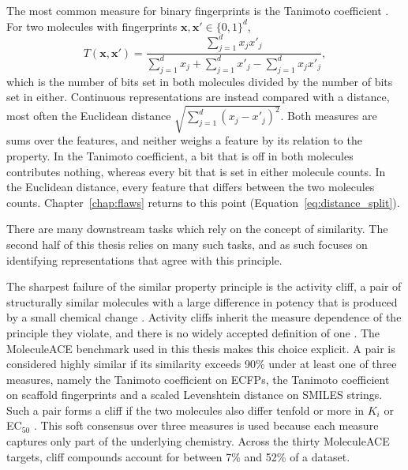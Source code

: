 The most common measure for binary fingerprints is the Tanimoto coefficient \citep{Bajusz2015}. For two molecules with fingerprints $\mathbf{x}, \mathbf{x}' \in \{0,1\}^d$,
\begin{equation}
T(\mathbf{x}, \mathbf{x}') = \frac{\sum_{j=1}^{d} x_j x'_j}{\sum_{j=1}^{d} x_j + \sum_{j=1}^{d} x'_j - \sum_{j=1}^{d} x_j x'_j},
\label{eq:tanimoto}
\end{equation}
which is the number of bits set in both molecules divided by the number of bits set in either. Continuous representations are instead compared with a distance, most often the Euclidean distance $\sqrt{\sum_{j=1}^{d}(x_j - x'_j)^2}$. Both measures are sums over the features, and neither weighs a feature by its relation to the property. In the Tanimoto coefficient, a bit that is off in both molecules contributes nothing, whereas every bit that is set in either molecule counts. In the Euclidean distance, every feature that differs between the two molecules counts. Chapter~\ref{chap:flaws} returns to this point (Equation~\ref{eq:distance_split}).

There are many downstream tasks which rely on the concept of similarity. The second half of this thesis relies on many such tasks, and as such focuses on identifying representations that agree with this principle. 


The sharpest failure of the similar property principle is the activity cliff, a pair of structurally similar molecules with a large difference in potency that is produced by a small
chemical change \citep{Maggiora2006, Stumpfe2012}. Activity cliffs inherit the measure dependence of the principle they violate, and there is no widely accepted definition of one
\citep{vanTilborg2022}. The MoleculeACE benchmark used in this thesis makes this choice explicit. A pair is considered highly similar if its similarity exceeds 90\% under at least one of
three measures, namely the Tanimoto coefficient on ECFPs, the Tanimoto coefficient on scaffold fingerprints and a scaled Levenshtein distance on SMILES strings. Such a pair forms a cliff if
the two molecules also differ tenfold or more in $K_i$ or EC$_{50}$ \citep{vanTilborg2022}. This soft consensus over three measures is used because each measure captures only part of the
underlying chemistry. Across the thirty MoleculeACE targets, cliff compounds account for between 7\% and 52\% of a dataset.

